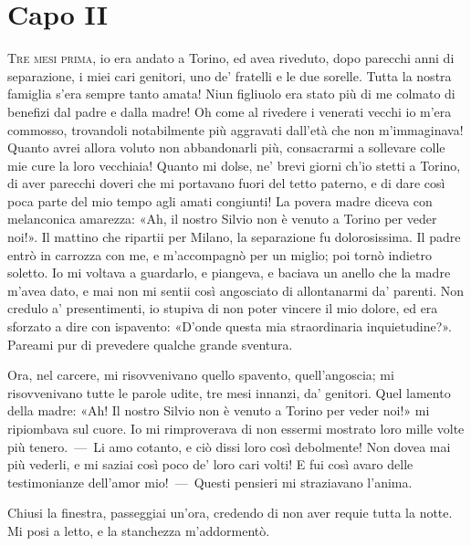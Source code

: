 
\chapter{Capo II}

\lettrine{T}{re mesi prima,} io era andato a Torino, ed avea riveduto, dopo parecchi
anni di separazione, i miei cari genitori, uno de' fratelli e le due
sorelle. Tutta la nostra famiglia s'era sempre tanto amata! Niun figliuolo
era stato più di me colmato di benefizi dal padre e dalla madre! Oh come al
rivedere i venerati vecchi io m'era commosso, trovandoli notabilmente più
aggravati dall'età che non m'immaginava! Quanto avrei allora voluto non
abbandonarli più, consacrarmi a sollevare colle mie cure la loro vecchiaia!
Quanto mi dolse, ne' brevi giorni ch'io stetti a Torino, di aver parecchi
doveri che mi portavano fuori del tetto paterno, e di dare così poca parte
del mio tempo agli amati congiunti! La povera madre diceva con melanconica
amarezza: «Ah, il nostro Silvio non è venuto a Torino per veder noi!». Il
mattino che ripartii per Milano, la separazione fu dolorosissima. Il padre
entrò in carrozza con me, e m'accompagnò per un miglio; poi tornò indietro
soletto. Io mi voltava a guardarlo, e piangeva, e baciava un anello che la
madre m'avea dato, e mai non mi sentii così angosciato di allontanarmi
da' parenti. Non credulo a' presentimenti, io stupiva di non poter vincere il
mio dolore, ed era sforzato a dire con ispavento: «D'onde questa mia
straordinaria inquietudine?». Pareami pur di prevedere qualche grande
sventura.

Ora, nel carcere, mi risovvenivano quello spavento, quell'angoscia; mi
risovvenivano tutte le parole udite, tre mesi innanzi, da' genitori. Quel
lamento della madre: «Ah! Il nostro Silvio non è venuto a Torino per veder
noi!» mi ripiombava sul cuore. Io mi rimproverava di non essermi mostrato
loro mille volte più tenero.~---~Li amo cotanto, e ciò dissi loro così
debolmente! Non dovea mai più vederli, e mi saziai così poco de' loro cari
volti! E fui così avaro delle testimonianze dell'amor mio!~---~Questi
pensieri mi straziavano l'anima.

Chiusi la finestra, passeggiai un'ora, credendo di non aver requie tutta la
notte. Mi posi a letto, e la stanchezza m'addormentò.

